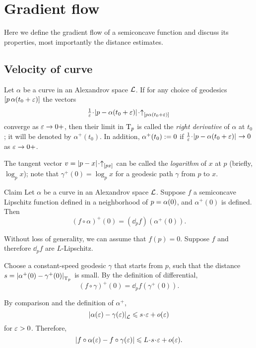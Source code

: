 
\chapter{Gradient flow}\label{chap:GF}

Here we define the gradient flow of a semiconcave function and discuss its properties,
most importantly the distance estimates.



\section{Velocity of curve}

Let $\alpha$ be a curve in an Alexandrov space $\mathcal{L}$.
If for any choice of 
geodesics $[p\,\alpha(t_0+\varepsilon)]$ the vectors 
\[\tfrac{1}{\eps}\cdot\dist{p}{\alpha(t_0+\eps)}{}\cdot\dir p{\alpha(t_0+\eps)}\]
converge as $\varepsilon\to 0+$, then their limit in $\mathrm{T}_p$ is called the \emph{right derivative} of $\alpha$ at $t_0$; it will be denoted by $\alpha^+(t_0)$.
In addition, $\alpha^+(t_0)\mathrel{:=}0$
if $\tfrac{1}{\eps}\cdot\dist{p}{\alpha(t_0+\eps)}{}\to 0$ as $\varepsilon\to 0+$.

The tangent vector $v=\dist px{}\cdot\dir px$ can be called the \emph{logarithm} of $x$ at $p$ (briefly, $\log_p x$);
note that $\gamma^+(0)=\log_px$ for a geodesic path $\gamma$ from $p$ to $x$.\label{page:log}


\begin{thm}{Claim}\label{clm:fa'=dfa'}
Let $\alpha$ be a curve in an Alexandrov space $\mathcal{L}$.
Suppose $f$ a semiconcave Lipschitz function
defined in a neighborhood of $p=\alpha(0)$,
and $\alpha^+(0)$ is defined.
Then 
\[(f\circ\alpha)^+(0)
=
(\dd_pf)(\alpha^+(0)).\]
\end{thm}

Without loss of generality, we can assume that $f(p)=0$.
Suppose $f$ and therefore $\dd_pf$ are $L$-Lipschitz.

Choose a constant-speed geodesic $\gamma$ that starts from $p$,
such that the distance
$s=|{\alpha^+(0)}-{\gamma^+(0)}|_{\mathrm{T}_p}^{{}}$
is small.
By the definition of differential,
\[(f\circ\gamma)^+(0)=\dd_pf(\gamma^+(0)).\]

By comparison and the definition of $\alpha^+$,
\[\dist{\alpha(\eps)}{\gamma(\eps)}{\spc{L}}\le s\cdot\eps+o(\eps)\]
for $\varepsilon>0$.
Therefore,
\[|f\circ\alpha(\eps)-f\circ\gamma(\eps)|\le L\cdot s\cdot\eps+o(\eps).\]

